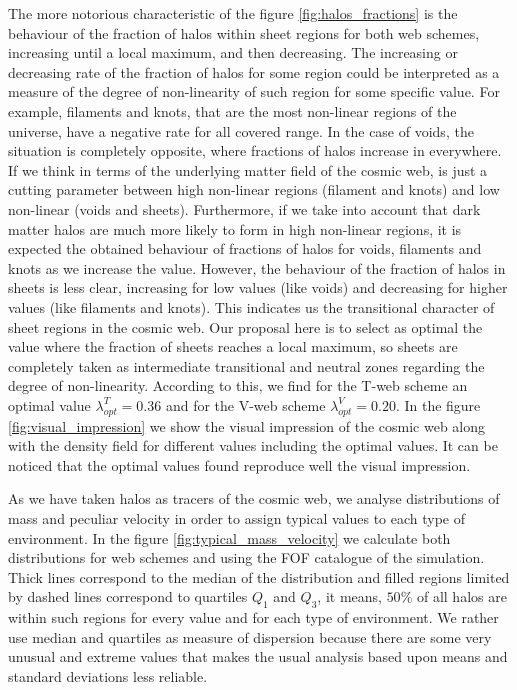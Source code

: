 \documentclass[a4,useAMS,usenatbib,usegraphicx]{latex/mn2e}
\begin{document}
The more notorious characteristic of the figure \ref{fig:halos_fractions} 
is the behaviour of the fraction of halos within sheet regions for both 
web schemes, increasing until a local maximum, and then decreasing. The 
increasing or decreasing rate of the fraction of halos for some region 
could be interpreted as a measure of the degree of non-linearity of such 
region for some specific \lth value. For example, filaments and knots, 
that are the most non-linear regions of the universe, have a negative rate
for all covered \lth range. In the case of voids, the situation is 
completely opposite, where fractions of halos increase in everywhere. If 
we think in terms of the underlying matter field of the cosmic web, \lth 
is just a cutting parameter between high non-linear regions (filament and 
knots) and low non-linear (voids and sheets). Furthermore, if we take into 
account that dark matter halos are much more likely to form in high 
non-linear regions, it is expected the obtained behaviour of fractions of 
halos for voids, filaments and knots as we increase the \lth value. 
However, the behaviour of the fraction of halos in sheets is less clear,
increasing for low \lth values (like voids) and decreasing for higher \lth 
values (like filaments and knots). This indicates us the transitional 
character of sheet regions in the cosmic web. Our proposal here is to 
select as optimal \lth the value where the fraction of sheets reaches a
local maximum, so sheets are completely taken as intermediate transitional 
and neutral zones regarding the degree of non-linearity. According to this,
we find for the T-web scheme an optimal value $\lambda_{opt}^T = 0.36$ and
for the V-web scheme $\lambda_{opt}^V = 0.20$. In the figure 
\ref{fig:visual_impression} we show the visual impression of the cosmic 
web along with the density field for different \lth values including the 
optimal values. It can be noticed that the optimal values found reproduce 
well the visual impression.



As we have taken halos as tracers of the cosmic web, we analyse 
distributions of mass and peculiar velocity in order to assign typical 
values to each type of environment. In the figure 
\ref{fig:typical_mass_velocity} we calculate both distributions for web 
schemes and using the FOF catalogue of the simulation. Thick lines 
correspond to the median of the distribution and filled regions limited by
dashed lines correspond to quartiles $Q_1$ and $Q_3$, it means, $50\%$ of
all halos are within such regions for every \lth value and for each type 
of environment. We rather use median and quartiles as measure of 
dispersion because there are some very unusual and extreme values that 
makes the usual analysis based upon means and standard deviations less 
reliable.
\end{document}
